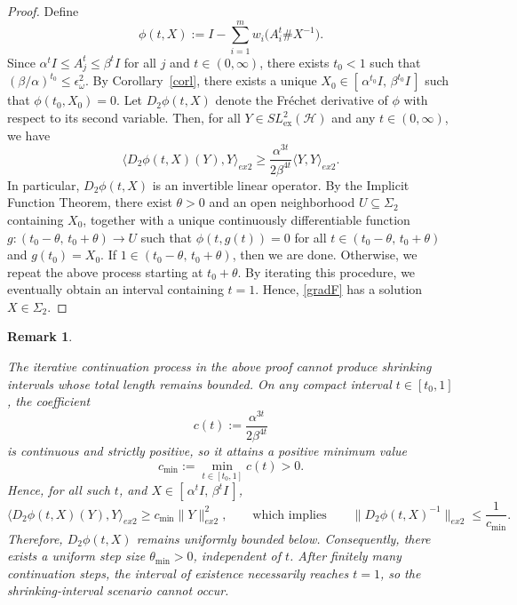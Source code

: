 \documentclass[12pt,reqno]{amsart}
\newtheorem{Remark}[theorem]{Remark}
\newenvironment{remark}{\begin{Remark}\begin{em}}{\end{em}\end{Remark}}
\begin{document}
\begin{proof}
Define
\[
\phi(t, X) := I - \sum_{i=1}^{m} w_{i} \big( A_{i}^{t} \# X^{-1} \big).
\]
Since \( \alpha^{t} I \leq A_j^{t} \leq \beta^{t} I \) for all \( j \) and \( t \in (0, \infty) \),
there exists \( t_{0} < 1 \) such that \( (\beta / \alpha)^{t_{0}} \leq \epsilon_{\omega}^{2} \).
By Corollary~\ref{corl}, there exists a unique
\( X_{0} \in [\, \alpha^{t_{0}} I,\, \beta^{t_{0}} I \,] \)
such that \( \phi(t_{0}, X_{0}) = 0 \).
Let \( D_{2} \phi(t, X) \) denote the Fréchet derivative of \( \phi \) with respect to its second variable.
Then, for all \( Y \in SL^{2}_{\mathrm{ex}}(\mathcal{H}) \) and any \( t \in (0, \infty) \), we have
\[
\langle D_{2} \phi(t, X)(Y), Y \rangle_{ex2}
\geq \frac{\alpha^{3t}}{2\beta^{4t}} \langle Y, Y \rangle_{ex2}.
\]
In particular, \( D_{2} \phi(t, X) \) is an invertible linear operator.
By the Implicit Function Theorem, there exist \( \theta > 0 \)
and an open neighborhood \( U \subseteq \Sigma_{2} \) containing \( X_{0} \),
together with a unique continuously differentiable function
$
g : (t_{0} - \theta,\, t_{0} + \theta) \to U
$
such that \( \phi(t, g(t)) = 0 \) for all \( t \in (t_{0} - \theta,\, t_{0} + \theta) \)
and \( g(t_{0}) = X_{0} \).
If \( 1 \in (t_{0} - \theta,\, t_{0} + \theta) \), then we are done.
Otherwise, we repeat the above process starting at \( t_{0} + \theta \).
By iterating this procedure, we eventually obtain an interval containing \( t = 1 \).
Hence, \eqref{gradF} has a solution \( X \in \Sigma_{2} \).
\end{proof}


\begin{remark}
The iterative continuation process in the above proof cannot produce shrinking intervals whose total length remains bounded. On any compact interval $t \in [t_0,1]$, the coefficient
\[
c(t) := \frac{\alpha^{3t}}{2\beta^{4t}}
\]
is continuous and strictly positive, so it attains a positive minimum value
\[
c_{\min} := \min_{t \in [t_0,1]} c(t) > 0.
\]
Hence, for all such $t$, and  $X \in [\, \alpha^{t} I,\, \beta^{t} I \,]$,
\[
\langle D_2\phi(t,X)(Y), Y\rangle_{ex2} \ge c_{\min}\|Y\|^2_{ex2},
\qquad\text{which implies}\qquad
\|D_2\phi(t,X)^{-1}\|_{ex2} \le \frac{1}{c_{\min}}.
\]
Therefore, $D_2\phi(t,X)$ remains uniformly bounded below.
Consequently, there exists a uniform step size $\theta_{\min} > 0$, independent of $t$.
After finitely many continuation steps, the interval of existence necessarily reaches $t=1$,
so the shrinking-interval scenario cannot occur.
\end{remark}
\end{document}
